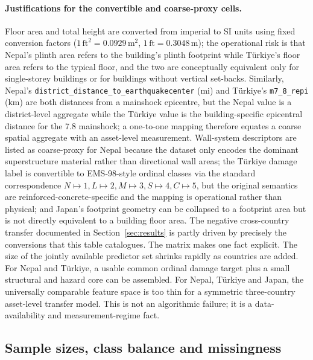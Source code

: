 \documentclass[11pt,a4paper]{article}
\begin{document}
\paragraph{Justifications for the convertible and coarse-proxy cells.} Floor area and total height are converted from imperial to SI units using fixed conversion factors ($1\,\text{ft}^2 = 0.0929\, \text{m}^2$, $1\,\text{ft} = 0.3048\,\text{m}$); the operational risk is that Nepal's plinth area refers to the building's plinth footprint while T\"urkiye's floor area refers to the typical floor, and the two are conceptually equivalent only for single-storey buildings or for buildings without vertical set-backs. Similarly, Nepal's \texttt{district\_distance\_to\_earthquakecenter} (mi) and T\"urkiye's \texttt{m7\_8\_repi} (km) are both distances from a mainshock epicentre, but the Nepal value is a district-level aggregate while the T\"urkiye value is the building-specific epicentral distance for the 7.8 mainshock; a one-to-one mapping therefore equates a coarse spatial aggregate with an asset-level measurement. Wall-system descriptors are listed as coarse-proxy for Nepal because the dataset only encodes the dominant superstructure material rather than directional wall areas; the T\"urkiye damage label is convertible to EMS-98-style ordinal classes via the standard correspondence $N{\mapsto}1, L{\mapsto}2, M{\mapsto}3, S{\mapsto}4, C{\mapsto}5$, but the original semantics are reinforced-concrete-specific and the mapping is operational rather than physical; and Japan's footprint geometry can be collapsed to a footprint area but is not directly equivalent to a building floor area. The negative cross-country transfer documented in Section~\ref{sec:results} is partly driven by precisely the conversions that this table catalogues. The matrix makes one fact explicit. The size of the jointly available predictor set shrinks rapidly as countries are added. For Nepal and T\"urkiye, a usable common ordinal damage target plus a small structural and hazard core can be assembled. For Nepal, T\"urkiye and Japan, the universally comparable feature space is too thin for a symmetric three-country asset-level transfer model. This is not an algorithmic failure; it is a data-availability and measurement-regime fact.

\subsection{Sample sizes, class balance and missingness}
\label{sec:data-samples}
\end{document}
